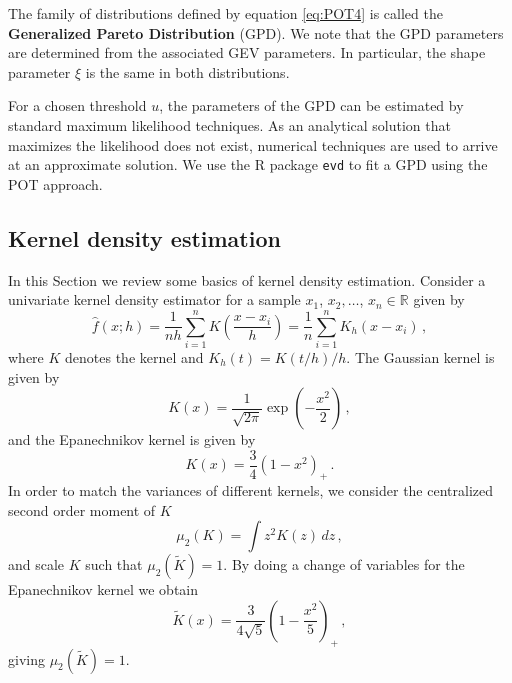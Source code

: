 \documentclass[11pt,a4paper,]{article}
\theoremstyle{definition}
\theoremstyle{definition}
\theoremstyle{definition}
\theoremstyle{remark}
\begin{document}
The family of distributions defined by equation \eqref{eq:POT4} is called the \textbf{Generalized Pareto Distribution} (GPD). We note that the GPD parameters are determined from the associated GEV parameters. In particular, the shape parameter \(\xi\) is the same in both distributions.

For a chosen threshold \(u\), the parameters of the GPD can be estimated by standard maximum likelihood techniques. As an analytical solution that maximizes the likelihood does not exist, numerical techniques are used to arrive at an approximate solution. We use the R package \texttt{evd} to fit a GPD using the POT approach.

\hypertarget{kernel-density-estimation}{%
\subsection{\texorpdfstring{Kernel density estimation \label{subsec:kde}}{Kernel density estimation }}\label{kernel-density-estimation}}

In this Section we review some basics of kernel density estimation. Consider a univariate kernel density estimator for a sample \({x}_1\), \({x}_2, \ldots\), \({x}_n \in \mathbb{R}\) given by
\begin{equation}\label{eq:kde1}
\hat{f}(x;h) = \frac{1}{nh}\sum_{i=1}^n K\left(\frac{x-x_i}{h}\right) = \frac{1}{n} \sum_{i=1}^n K_h(x-x_i)\, , 
\end{equation}
where \(K\) denotes the kernel and \(K_h(t) = K(t/h)/h\). The Gaussian kernel is given by
\begin{equation}\label{eq:kde2}
    K(x) = \frac{1}{\sqrt{2\pi }}{\exp\left(-\frac{x^2}{2}\right)} \, , 
\end{equation}
and the Epanechnikov kernel is given by
\begin{equation}\label{eq:kde3}
    K(x) = \frac{3}{4}\left(1 - x^2 \right)_+ \, .
\end{equation}
In order to match the variances of different kernels, we consider the centralized second order moment of \(K\)
\begin{equation}\label{eq:kde4}
 \mu_2(K) = \int z^2 K(z) \, dz \, , 
\end{equation}
and scale \(K\) such that \(\mu_2(\tilde{K}) = 1\). By doing a change of variables for the Epanechnikov kernel we obtain
\begin{equation}\label{eq:kde5}
    \tilde{K}(x) = \frac{3}{4 \sqrt{5}}\left(1 - \frac{x^2}{5} \right)_+ \, ,
\end{equation}
giving \(\mu_2(\tilde{K}) = 1\).
\end{document}
